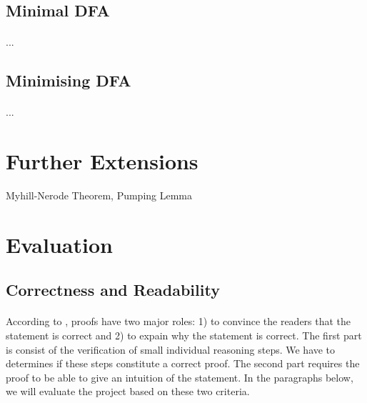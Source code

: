 \documentclass[twoside,openright,final]{bhamthesis}
\begin{document}
\subsection{Minimal DFA}
\paragraph{} ...

\subsection{Minimising DFA}
\paragraph{} ...

\newpage
\section{Further Extensions}
\par Myhill-Nerode Theorem, Pumping Lemma

\newpage
\section{Evaluation}

\subsection{Correctness and Readability}
\paragraph{} According to \cite{geuvers2009}, proofs have two major roles: 1)
to convince the readers that the statement is correct and 2) to expain
why the statement is correct. The first part is consist of the
verification of small individual reasoning steps. We have to
determines if these steps constitute a correct proof. The second part
requires the proof to be able to give an intuition of the
statement. In the paragraphs below, we will evaluate the project based
on these two criteria. 
\end{document}
